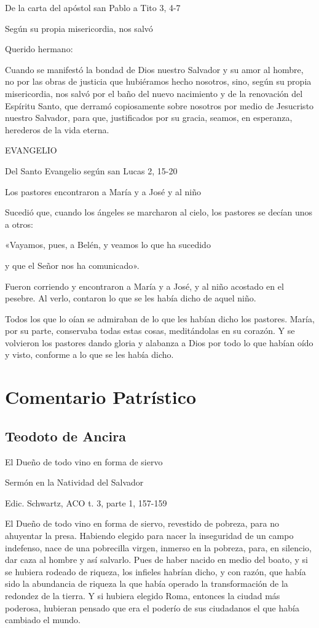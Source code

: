 De la carta del apóstol san Pablo a Tito 3, 4-7

Según su propia misericordia, nos salvó

Querido hermano:

Cuando se manifestó la bondad de Dios nuestro Salvador y su amor al
hombre, no por las obras de justicia que hubiéramos hecho nosotros,
sino, según su propia misericordia, nos salvó por el baño del nuevo
nacimiento y de la renovación del Espíritu Santo, que derramó
copiosamente sobre nosotros por medio de Jesucristo nuestro Salvador,
para que, justificados por su gracia, seamos, en esperanza, herederos de
la vida eterna.

EVANGELIO

Del Santo Evangelio según san Lucas 2, 15-20

Los pastores encontraron a María y a José y al niño

Sucedió que, cuando los ángeles se marcharon al cielo, los pastores se
decían unos a otros:

«Vayamos, pues, a Belén, y veamos lo que ha sucedido

y que el Señor nos ha comunicado».

Fueron corriendo y encontraron a María y a José, y al niño acostado en
el pesebre. Al verlo, contaron lo que se les había dicho de aquel niño.

Todos los que lo oían se admiraban de lo que les habían dicho los
pastores. María, por su parte, conservaba todas estas cosas,
meditándolas en su corazón. Y se volvieron los pastores dando gloria y
alabanza a Dios por todo lo que habían oído y visto, conforme a lo que
se les había dicho.

\section{Comentario Patrístico}

\subsection{Teodoto de Ancira}

El Dueño de todo vino en forma de siervo

Sermón en la Natividad del Salvador

Edic. Schwartz, ACO t. 3, parte 1, 157-159

El Dueño de todo vino en forma de siervo, revestido de pobreza, para no ahuyentar la presa. Habiendo elegido para nacer la inseguridad de un campo indefenso, nace de una pobrecilla virgen, inmerso en la pobreza, para, en silencio, dar caza al hombre y así salvarlo. Pues de haber nacido en medio del boato, y si se hubiera rodeado de riqueza, los infieles habrían dicho, y con razón, que había sido la abundancia de riqueza la que había operado la transformación de la redondez de la tierra. Y si hubiera elegido Roma, entonces la ciudad más poderosa, hubieran pensado que era el poderío de sus ciudadanos el que había cambiado el mundo.

